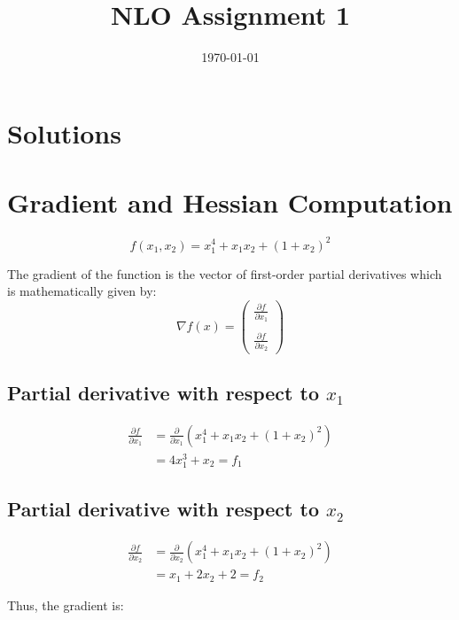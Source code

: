 \documentclass{article}
\begin{document}
\title{NLO Assignment 1}
\author{}
\date{\today}
\maketitle

\section*{Solutions}



\section{Gradient and Hessian Computation}
\begin{equation}
f(x_1, x_2) = x_1^4 + x_1x_2 + (1 + x_2)^2
\end{equation}

The gradient of the function is the vector of first-order partial derivatives which is mathematically given by: 
\begin{equation}
\nabla f(x) =
\begin{pmatrix}
\frac{\partial f}{\partial x_1}\\
\\
\frac{\partial f}{\partial x_2}
\end{pmatrix}
\end{equation}


\subsection*{Partial derivative with respect to \( x_1 \)}
\begin{align*}
\frac{\partial f}{\partial x_1} &= \frac{\partial}{\partial x_1} \left( x_1^4 + x_1x_2 + (1 + x_2)^2 \right) \\
&= 4x_1^3 + x_2 = f_1
\end{align*}

\subsection*{Partial derivative with respect to \( x_2 \)}
\begin{align*}
\frac{\partial f}{\partial x_2} &= \frac{\partial}{\partial x_2} \left( x_1^4 + x_1x_2 + (1 + x_2)^2 \right) \\
&= x_1 + 2x_2 + 2 = f_2
\end{align*}

Thus, the gradient is:
\end{document}
